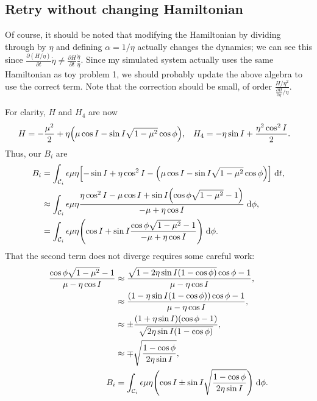 \documentclass[11pt,
        usenames, %
        dvipsnames %
    ]{article}
\newcommand*{\pd}[2]{\frac{\partial#1}{\partial#2}}
\DeclarePairedDelimiter\p{\lparen}{\rparen}
\DeclarePairedDelimiter\s{\lbrack}{\rbrack}
\begin{document}
\subsection{Retry without changing Hamiltonian}

Of course, it should be noted that modifying the Hamiltonian by dividing through
by $\eta$ and defining $\alpha = 1/\eta$ actually changes the dynamics; we can
see this since $\pd{(H/\eta)}{t}\dot{\eta} \neq
\pd{H}{t}\frac{\dot{\eta}}{\eta}$. Since my simulated system actually uses the
same Hamiltonian as toy problem 1, we should probably update the above algebra
to use the correct term. Note that the correction should be small, of order
$\frac{H/\eta^2}{\pd{H}{\eta}/\eta}$.

For clarity, $H$ and $H_4$ are now
\begin{align*}
    H &= -\frac{\mu^2}{2}
            + \eta\p*{\mu \cos I - \sin I \sqrt{1 - \mu^2}\cos \phi}, &
    H_4 &= -\eta \sin I + \frac{\eta^2 \cos^2 I}{2}.
\end{align*}
Thus, our $B_i$ are
\begin{align*}
    B_i &= \int_{\mathcal{C}_i} \epsilon \mu \eta
            \s*{-\sin I + \eta \cos^2 I -
                \p*{\mu \cos I - \sin I \sqrt{1 - \mu^2}\cos \phi}}
            \;\mathrm{d}t,\\
        &\approx \int_{\mathcal{C}_i} \epsilon \mu \eta
            \frac{\eta \cos^2 I - \mu \cos I
                + \sin I\p*{\cos \phi \sqrt{1 - \mu^2} - 1}}{-\mu + \eta \cos I}
            \;\mathrm{d}\phi,\\
        &= \int_{\mathcal{C}_i} \epsilon \mu \eta
            \p*{\cos I + \sin I \frac{\cos \phi \sqrt{1 - \mu^2} - 1}{-\mu +
            \eta \cos I}} \;\mathrm{d}\phi.
\end{align*}
That the second term does not diverge requires some careful work:
\begin{align*}
    \frac{\cos \phi\sqrt{1 - \mu^2} - 1}{\mu - \eta \cos I}
        &\approx \frac{\sqrt{1 - 2\eta \sin I\p*{1 - \cos \phi}}\cos \phi
            - 1}{\mu - \eta \cos I},\\
        &\approx \frac{(1 - \eta \sin I(1 - \cos \phi))\cos \phi - 1}{
            \mu - \eta \cos I},\\
        &\approx \pm\frac{(1 + \eta \sin I)(\cos \phi - 1)}{\sqrt{2\eta \sin I
            (1 - \cos \phi)}},\\
        &\approx \mp\sqrt{\frac{1 - \cos \phi}{2\eta \sin I}},\\
    B_i &= \int_{\mathcal{C}_i} \epsilon \mu \eta
            \p*{\cos I \pm \sin I
                \sqrt{\frac{1 - \cos \phi}{2\eta \sin I}}} \;\mathrm{d}\phi.
\end{align*}
\end{document}

